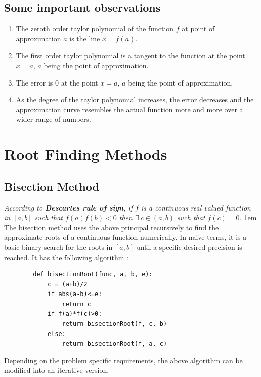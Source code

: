 \documentclass[12,a4paper]{article}
\begin{document}
    \subsection{Some important observations}
    \begin{enumerate}
        \item The zeroth order taylor polynomial of the function $f$ at point of approximation $a$ is the line $x = f(a)$.
        \item The first order taylor polynomial is a tangent to the function at the point $x = a$, $a$ being the point of approximation.
        \item The error is $0$ at the point $x = a$, $a$ being the point of approximation.
        \item As the degree of the taylor polynomial increases, the error decreases and the approximation curve resembles the actual function more and more over a wider range of numbers.
    \end{enumerate}
    \section{Root Finding Methods}
    \subsection{Bisection Method}
    \emph{According to \textbf{Descartes rule of sign}, if $f$ is a continuous real valued function in $[a,b]$ such that $f(a)f(b)<0$ then $\exists \ c \in (a,b)$ such that $f(c)=0$.}
    \parskip 1em
    The bisection method uses the above principal recursively to find the approximate roots of a continuous function numerically. In naive terms, it is a basic binary search for the roots in $[a,b]$ until a specific desired precision is reached. It has the following algorithm :
    \begin{lstlisting}
        def bisectionRoot(func, a, b, e):
            c = (a+b)/2
            if abs(a-b)<=e:
                return c
            if f(a)*f(c)>0:
                return bisectionRoot(f, c, b)
            else:
                return bisectionRoot(f, a, c)
    \end{lstlisting}
    Depending on the problem specific requirements, the above algorithm can be modified into an iterative version.
\end{document}

